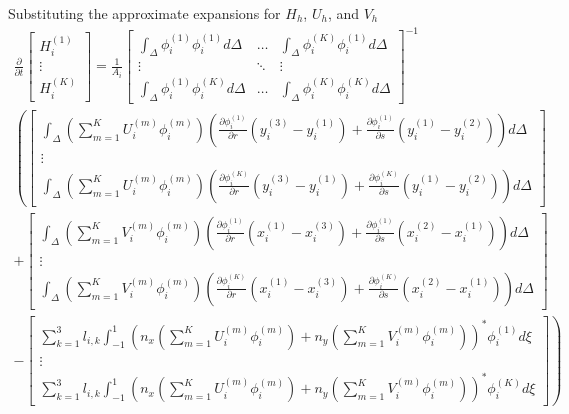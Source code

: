 \documentclass[11pt]{article}
\begin{document}
Substituting the approximate expansions for $H_h$, $U_h$, and $V_h$ 
{\tiny
\begin{multline}
\frac{\partial}{\partial t} \begin{bmatrix} H_i^{(1)} \\[5pt] \vdots \\[5pt] H_i^{(K)}  \end{bmatrix} =\frac{1}{A_i}\begin{bmatrix}\displaystyle\int_{\Delta}\phi_i^{(1)}\phi_i^{(1)}d\Delta & \hdots & \displaystyle\int_{\Delta}\phi_i^{(K)}\phi_i^{(1)}d\Delta \\[5pt] \vdots & \ddots & \vdots \\[5pt]  \displaystyle\int_{\Delta}\phi_i^{(1)}\phi_i^{(K)}d\Delta & \hdots & \displaystyle\int_{\Delta}\phi_i^{(K)}\phi_i^{(K)}d\Delta\end{bmatrix}^{-1}  \\ \left( \begin{bmatrix}\displaystyle\int_{\Delta}\left(\displaystyle\sum_{m=1}^{K}U_i^{(m)}\phi_i^{(m)}\right)\left(\frac{\partial \phi_i^{(1)}}{\partial r}\left(y_i^{(3)}-y_i^{(1)}\right) + \frac{\partial \phi_i^{(1)}}{\partial s}\left(y_i^{(1)}-y_i^{(2)}\right) \right)d\Delta     \\ \vdots \\ \displaystyle\int_{\Delta}\left(\displaystyle\sum_{m=1}^{K}U_i^{(m)}\phi_i^{(m)}\right)\left(\frac{\partial \phi_i^{(K)}}{\partial r}\left(y_i^{(3)}-y_i^{(1)}\right) + \frac{\partial \phi_i^{(K)}}{\partial s}\left(y_i^{(1)}-y_i^{(2)}\right) \right) d\Delta \end{bmatrix} \right.\\+ \left. \begin{bmatrix}  \displaystyle\int_{\Delta}\left(\displaystyle\sum_{m=1}^{K}V_i^{(m)}\phi_i^{(m)}\right)\left(\frac{\partial \phi_i^{(1)}}{\partial r}\left(x_i^{(1)}-x_i^{(3)}\right) + \frac{\partial \phi_i^{(1)}}{\partial s}\left(x_i^{(2)}-x_i^{(1)}\right) \right)d\Delta \\ \vdots \\ \displaystyle\int_{\Delta}\left(\displaystyle\sum_{m=1}^{K}V_i^{(m)}\phi_i^{(m)}\right)\left(\frac{\partial \phi_i^{(K)}}{\partial r}\left(x_i^{(1)}-x_i^{(3)}\right) + \frac{\partial \phi_i^{(K)}}{\partial s}\left(x_i^{(2)}-x_i^{(1)}\right) \right) d\Delta \end{bmatrix}  \right. \\ \left. -\begin{bmatrix}\displaystyle\sum_{k=1}^3 l_{i,k}\int_{-1}^1 \left(n_x\left(\displaystyle\sum_{m=1}^{K}U_i^{(m)}\phi_i^{(m)}\right)  + n_y\left(\displaystyle\sum_{m=1}^{K}V_i^{(m)}\phi_i^{(m)}\right)\right)^*\phi_i^{(1)} d\xi \\ \vdots \\ \displaystyle\sum_{k=1}^3 l_{i,k}\int_{-1}^1 \left(n_x\left(\displaystyle\sum_{m=1}^{K}U_i^{(m)}\phi_i^{(m)}\right) + n_y\left(\displaystyle\sum_{m=1}^{K}V_i^{(m)}\phi_i^{(m)}\right)\right)^*\phi_i^{
(K)} d\xi \end{bmatrix} \right) 
\end{multline}}
\end{document}
